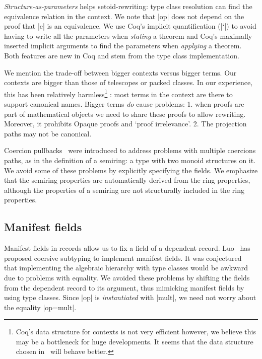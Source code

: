 \documentclass[a4paper,10pt, runningheads]{llncs}
\begin{document}
\emph{Structure-as-parameters} helps setoid-rewriting: type class resolution
can find the equivalence relation in the context.
We note that |op| does not depend on the proof that |e| is an equivalence. We use Coq's implicit
quantification (|`{}|) to avoid having to write all the parameters when \emph{stating} a theorem
and Coq's maximally inserted implicit arguments to find the parameters when \emph{applying} a
theorem. Both features are new in Coq and stem from the type class implementation.

We mention the trade-off between bigger contexts versus bigger terms. Our contexts are bigger than
those of telescopes or packed classes. In our experience, this has been relatively
harmless\footnote{Coq's data structure for contexts is not very efficient however, we believe this
may be a bottleneck for huge developments. It seems that the data structure chosen
in~\cite{asperti2009compact} will behave better.}%
: most
terms in the context are there to support canonical names. Bigger terms
\emph{do} cause problems: 1. when proofs are part of mathematical objects we need to share these
proofs to allow rewriting. Moreover, it prohibits Opaque proofs and `proof irrelevance'. 2. The
projection paths may not be canonical.

Coercion pullbacks~\cite{Hints} were introduced to address problems with multiple coercions paths,
as in the definition of a semiring: a type with two monoid structures on it. We avoid some
of these problems by explicitly specifying the fields. We emphasize that the semiring properties are automatically derived from the ring
properties, although the properties of a semiring are not structurally included in the ring
properties.

\subsection{Manifest fields}\label{manifest}

Manifest fields in records allow us to fix a field of a dependent record.
Luo~\cite{DBLP:conf/types/Luo08} has proposed coersive subtyping to implement manifest fields.
It was conjectured~\cite{Hints} that implementing the algebraic hierarchy with type classes would
be awkward due to problems with equality. We avoided these problems by shifting the fields
from the dependent record to its argument, thus mimicking manifest fields by using type classes.
Since |op| is \emph{instantiated} with |mult|, we need not worry about the
equality |op=mult|.
\end{document}
